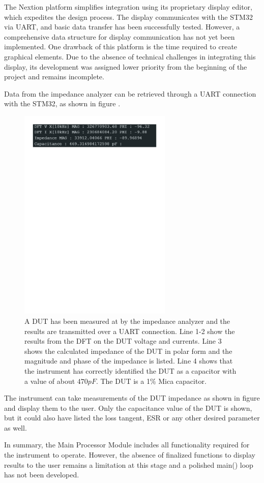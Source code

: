 The Nextion platform simplifies integration using its proprietary display editor, which expedites the design process. The display communicates with the STM32 via UART, and basic data transfer has been successfully tested. However, a comprehensive data structure for display communication has not yet been implemented. One drawback of this platform is the time required to create graphical elements. Due to the absence of technical challenges in integrating this display, its development was assigned lower priority from the beginning of the project and remains incomplete.

Data from the impedance analyzer can be retrieved through a UART connection with the STM32, as shown in figure .

\begin{figure}[H] \centering \includegraphics[clip, trim=0 700 0 0, width=0.65\textwidth]{Sections/7_SystemDesign/Figures/7_3_3_CapMeasuredSerialPrint.pdf} \caption{A DUT has been measured at  by the impedance analyzer and the results are transmitted over a UART connection. Line 1-2 show the results from the DFT on the DUT voltage and currents. Line 3 shows the calculated impedance of the DUT in polar form and the magnitude and phase of the impedance is listed. Line 4 shows that the instrument has correctly identified the DUT as a capacitor with a value of about $470pF$. The DUT is a  1\% Mica capacitor.} \label{fig:7_3_3_CapMeasSerialPrint} \end{figure}

The instrument can take measurements of the DUT impedance as shown in figure  and display them to the user. Only the capacitance value of the DUT is shown, but it could also have listed the loss tangent, ESR or any other desired parameter as well.

In summary, the Main Processor Module includes all functionality required for the instrument to operate. However, the absence of finalized functions to display results to the user remains a limitation at this stage and a polished main() loop has not been developed.